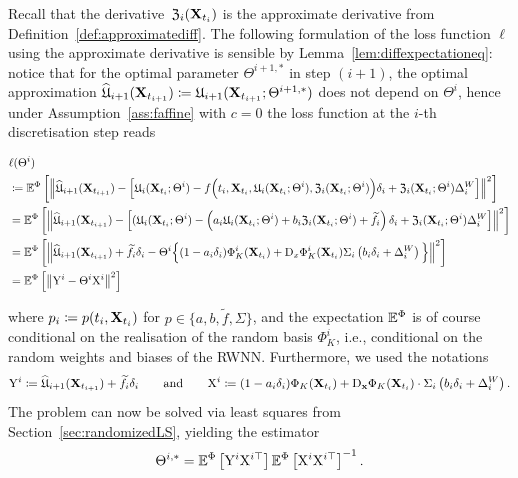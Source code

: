 Recall that the derivative~$\mathfrak{Z}_{i}(\mathbf{X}_{t_i})$ is the approximate derivative from Definition~\ref{def:approximatediff}. The following formulation of the loss function $\ell$ using the approximate derivative is sensible by Lemma~\ref{lem:diffexpectationeq}: notice that for the optimal parameter $\Theta^{i+1, *}$ in step $(i+1)$, the optimal approximation $\widehat {\mathfrak{U}}_{i+1}(\mathbf{X}_{t_{i+1}})\coloneqq\mathfrak{U}_{i+1}(\mathbf{X}_{t_{i+1}}; \Theta^{i+1, *})$ 
does not depend on $\Theta^i$, hence under Assumption~\ref{ass:faffine} with $c=0$ the loss function at the $i$-th discretisation step reads
\begin{small}
\begin{align*}
    &\ell(\Theta^i) \\
    &\coloneqq \mathbb{E}^\Phi\left[\left\| \widehat {\mathfrak{U}}_{i+1}(\mathbf{X}_{t_{i+1}}) - \left[\mathfrak{U}_i(\mathbf{X}_{t_i};\Theta^i) - f\Big(t_{i}, \mathbf{X}_{t_{i}}, \mathfrak{U}_i(\mathbf{X}_{t_i};\Theta^i), \mathfrak{Z}_{i}(\mathbf{X}_{t_i}; \Theta^i)\Big)\delta_{i} + \mathfrak{Z}_{i}(\mathbf{X}_{t_i}; \Theta^i)\Delta^{W}_{i}\right] \right\|^2\right] \\
    &= \mathbb{E}^\Phi\left[\left\| \widehat {\mathfrak{U}}_{i+1}(\mathbf{X}_{t_{i+1}}) - \left[(\mathfrak{U}_i(\mathbf{X}_{t_i};\Theta^i) - \left(a_{i}\mathfrak{U}_i(\mathbf{X}_{t_i};\Theta^i) + b_{i}\mathfrak{Z}_{i}(\mathbf{X}_{t_i}; \Theta^i) + \widetilde{f}_{i}\right)\delta_{i} + \mathfrak{Z}_{i}(\mathbf{X}_{t_i}; \Theta^i)\Delta^{W}_{i}\right] \right\|^2\right] \\
    &= \mathbb{E}^\Phi\left[\left\| \widehat {\mathfrak{U}}_{i+1}(\mathbf{X}_{t_{i+1}}) + \widetilde{f}_{i}\delta_{i} - \Theta^i\Big\{(1-a_{i}\delta_{i})\Phi_K^i(\mathbf{X}_{t_i}) + \mathrm{D}_{x} \Phi_K^i(\mathbf{X}_{t_i}) \Sigma_i \left(b_{i}\delta_{i}  + \Delta^{W}_{i}\right)\Big\} \right\|^2\right] \\
    &= \mathbb{E}^\Phi\left[\left\| \mathrm{Y}^i - \Theta^i \mathrm{X}^i \right\|^2\right]
\end{align*}
\end{small}%
where $p_{i} \coloneqq  p(t_i, \mathbf{X}_{t_i})$ for $p \in \{a, b, \widetilde{f}, \Sigma\}$, and the expectation $\mathbb{E}^\Phi$ is of course conditional on the realisation of the random basis $\Phi_K^i$, i.e., conditional on the random weights and biases of the RWNN. Furthermore, we used the notations
\[
\mathrm{Y}^i \coloneqq \widehat {\mathfrak{U}}_{i+1}(\mathbf{X}_{t_{i+1}}) + \widetilde{f}_{i}\delta_{i}
    \qquad\text{and}\qquad
\mathrm{X}^i \coloneqq 
(1-a_{i}\delta_{i})\Phi_K(\mathbf{X}_{t_i}) + \mathrm{D}_{\boldsymbol{\mathrm{x}}}\Phi_K(\mathbf{X}_{t_i})\cdot \Sigma_i \left(b_{i}\delta_{i}  + \Delta^{W}_{i}\right).
\]
The problem can now be solved via least squares from Section~\ref{sec:randomizedLS}, yielding the estimator
$$
\Theta^{i,*} = \mathbb{E}^\Phi\left[\mathrm{Y}^i\mathrm{X}^{i\top}\right]
\mathbb{E}^\Phi\left[\mathrm{X}^i\mathrm{X}^{i\top}\right]^{-1}.
$$

